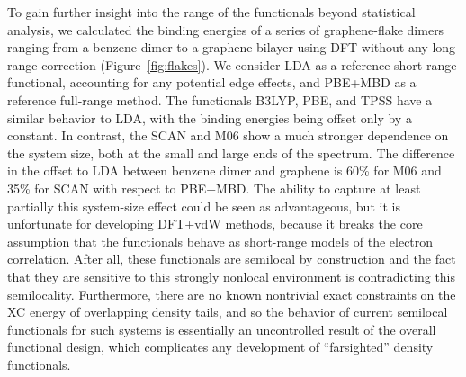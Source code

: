 To gain further insight into the range of the functionals beyond statistical analysis, we calculated the binding energies of a series of graphene-flake dimers ranging from a benzene dimer to a graphene bilayer using DFT without any long-range correction (Figure~\ref{fig:flakes}).
We consider LDA as a reference short-range functional, accounting for any potential edge effects, and PBE+MBD as a reference full-range method.
The functionals B3LYP, PBE, and TPSS have a similar behavior to LDA, with the binding energies being offset only by a constant.
In contrast, the SCAN and M06 show a much stronger dependence on the system size, both at the small and large ends of the spectrum.
The difference in the offset to LDA between benzene dimer and graphene is 60\% for M06 and 35\% for SCAN with respect to PBE+MBD\@.
The ability to capture at least partially this system-size effect could be seen as advantageous, but it is unfortunate for developing DFT+vdW methods, because it breaks the core assumption that the functionals behave as short-range models of the electron correlation.
After all, these functionals are semilocal by construction and the fact that they are sensitive to this strongly nonlocal environment is contradicting this semilocality.
Furthermore, there are no known nontrivial exact constraints on the XC energy of overlapping density tails, and so the behavior of current semilocal functionals for such systems is essentially an uncontrolled result of the overall functional design, which complicates any development of ``farsighted'' density functionals.

